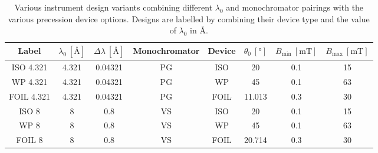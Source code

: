 \begin{table}[h!]
	\centering
	\begin{tabular}{ c|c c c | c c c c }
		\toprule
		Label & $\lambda_0~[\unit{\angstrom}]$ & $\Delta\lambda~[\unit{\angstrom}]$ & Monochromator & Device & $\theta_0~[\unit{\degree}]$ & $B_{\text{min}}~[\unit{\milli\tesla}]$ & $B_{\text{max}} ~[\unit{\milli\tesla}]$ \\
		\midrule
		ISO 4.321 & \num{4.321} & \num{0.04321} & PG & ISO & \num{20} & \num{0.1} & \num{15} \\
		WP 4.321 & \num{4.321} & \num{0.04321} & PG & WP & \num{45} & \num{0.1} & \num{63} \\
		FOIL 4.321 & \num{4.321} & \num{0.04321} & PG & FOIL & \num{11.013} & \num{0.3} & \num{30} \\
		ISO 8 & \num{8} & \num{0.8} & VS & ISO & \num{20} & \num{0.1} & \num{15} \\
		WP 8 & \num{8} & \num{0.8} & VS & WP & \num{45} & \num{0.1} & \num{63} \\
		FOIL 8 & \num{8} & \num{0.8} & VS & FOIL & \num{20.714} & \num{0.3} & \num{30} \\
		
		\bottomrule
	\end{tabular}
	\caption{Various instrument design variants combining different $\lambda_0$ and monochromator pairings with the various precession device options. Designs are labelled by combining their device type and the value of $\lambda_0$ in Å.}
	\label{tab:design-variants}
\end{table}
